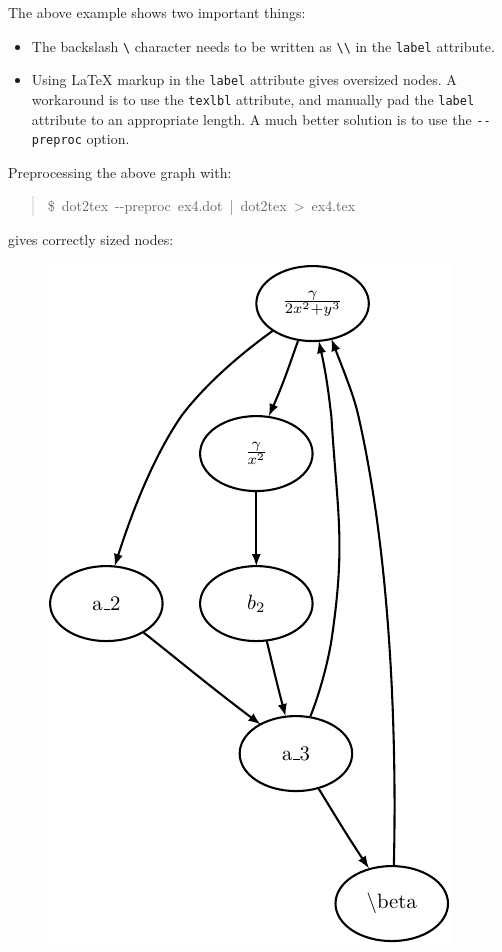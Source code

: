 \documentclass[10pt,a4paper,english]{article}
\begin{document}
The above example shows two important things:
\begin{itemize}
\item {} 
The backslash \texttt{{\textbackslash}} character needs to be written as \texttt{{\textbackslash}{\textbackslash}} in the \texttt{label} attribute.

\item {} 
Using LaTeX markup in the \texttt{label} attribute gives oversized nodes. A workaround  is to use the \texttt{texlbl} attribute, and manually pad the \texttt{label} attribute to an appropriate length. A much better solution is to use the \texttt{-{}-preproc} option.

\end{itemize}

Preprocessing the above graph with:
\begin{quote}{\ttfamily \raggedright \noindent
{\$}~dot2tex~-{}-preproc~ex4.dot~|~dot2tex~>~ex4.tex
}\end{quote}

gives correctly sized nodes:
\begin{figure}[H]
\centering

\includegraphics{pdf/texmodeb}
\end{figure}
\end{document}
